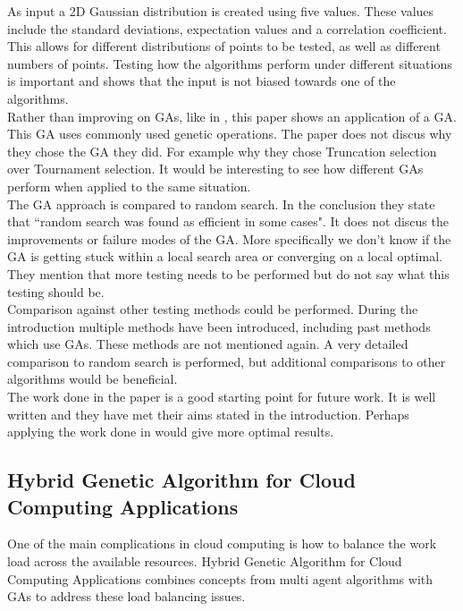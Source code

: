 \documentclass[10pt,a4paper,openbib]{article}
\begin{document}
\begin{multicols}{2}
\noindent As input a 2D Gaussian distribution is created using five values. These values include the standard deviations, expectation values and a correlation coefficient. This allows for different distributions of points to be tested, as well as different numbers of points. Testing how the algorithms perform under different situations is important and shows that the input is not biased towards one of the algorithms. \\

\noindent Rather than improving on GAs, like in \cite{IB_GA}, this paper shows an application of a GA. This GA uses commonly used genetic operations. The paper does not discus why they chose the GA they did. For example why they chose Truncation selection over Tournament selection. It would be interesting to see how different GAs perform when applied to the same situation.\\

\noindent The GA approach is compared to random search. In the conclusion they state that ``random search was found as efficient in some cases"\cite{nearestPoint}. It does not discus the improvements or failure modes of the GA. More specifically we don't know if the GA is getting stuck within a local search area or converging on a local optimal. They mention that more testing needs to be performed but do not say what this testing should be. \\

\noindent Comparison against other testing methods could be performed. During the introduction multiple methods have been introduced, including past methods which use GAs. These methods are not mentioned again. A very detailed comparison to random search is performed, but additional comparisons to other algorithms would be beneficial. \\

\noindent The work done in the paper is a good starting point for future work. It is well written and they have met their aims stated in the introduction. Perhaps applying the work done in \cite{IB_GA} would give more optimal results. 

\subsection{Hybrid Genetic Algorithm for Cloud Computing Applications \cite{CloudComputing}}
One of the main complications in cloud computing is how to balance the work load across the available resources. Hybrid Genetic Algorithm for Cloud Computing Applications\cite{CloudComputing} combines concepts from multi agent algorithms with GAs to address these load balancing issues.\\


\end{multicols}
\end{document}

